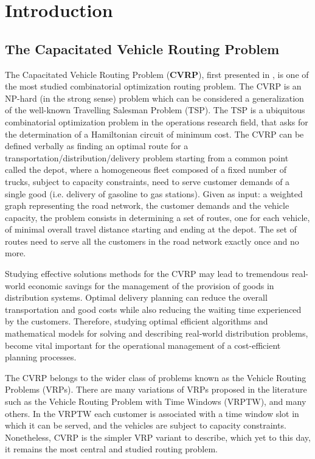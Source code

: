 \chapter{Introduction}
\label{sec:introduction-chapter}

\section{The Capacitated Vehicle Routing Problem}
\label{sec:intro-cvrp-problem}

The Capacitated Vehicle Routing Problem (\textbf{CVRP}), first presented in \textcite{dantzig1959},
is one of the most studied combinatorial optimization routing problem.
The CVRP is an NP-hard (in the strong sense) problem which can be considered a generalization
of the well-known Travelling Salesman Problem (TSP).
The TSP is a ubiquitous combinatorial optimization problem
in the operations research field,
that asks for the determination of a Hamiltonian circuit of minimum cost.
The CVRP can be defined verbally as finding an optimal route for a transportation/distribution/delivery problem
starting from a common point called the depot,
where a homogeneous fleet composed of a fixed number of trucks, subject to capacity constraints,
need to serve customer demands of a single good (i.e. delivery of gasoline to gas stations).
Given as input: a weighted graph representing the road network,
the customer demands and the vehicle capacity,
the problem consists in determining a set of routes, one for each vehicle,
of minimal overall travel distance starting and ending at the depot.
The set of routes need to serve all the customers in the road network exactly once and no more.

Studying effective solutions methods for the CVRP may lead to tremendous real-world economic
savings for the management of the provision of goods in distribution systems.
Optimal delivery planning can reduce the overall transportation and good costs while
also reducing the waiting time experienced by the customers.
Therefore, studying optimal efficient algorithms and mathematical models for
solving and describing real-world distribution problems, become vital
important for the operational management of a cost-efficient planning processes.

The CVRP belongs to the wider class of problems known as the Vehicle Routing Problems (VRPs).
There are many variations of VRPs proposed in the literature such as
the Vehicle Routing Problem with Time Windows (VRPTW), and many others.
In the VRPTW \parencite{schrage1981} each customer is associated with a time window slot
in which it can be served,
and the vehicles are subject to capacity constraints.
Nonetheless, CVRP is the simpler VRP variant to describe, which
yet to this day, it remains the most central and studied routing problem.

